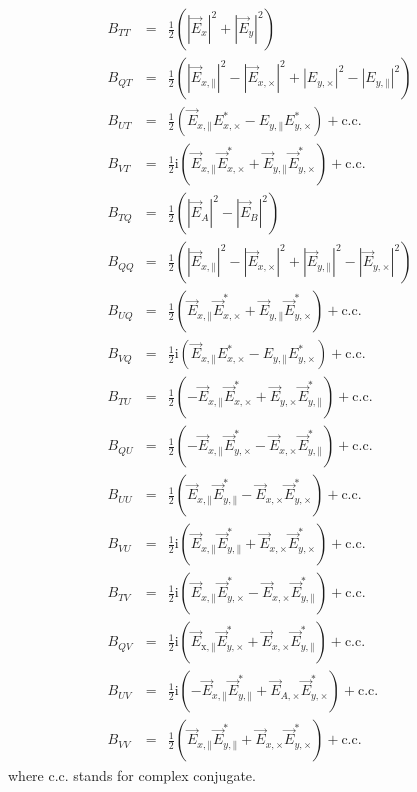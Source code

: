 \documentclass[a4paper,fleqn]{cas-dc}\sloppy
\newcommand{\co}{\mathbin{\|}}
\newcommand{\cx}{\mathbin{\times}}
\begin{document}
\begin{eqnarray}
B_{TT}&=&\frac{1}{2}\left(\left|\vec{E}_{x}\right|^{2}+\left|\vec{E}_{y}\right|^{2}\right)\\
B_{QT}&=&\frac{1}{2}\left(\left|\vec{E}_{x,\co}\right|^{2}-\left|\vec{E}_{x,\cx}\right|^{2} +  \left|E_{y,\cx}\right|^{2}-\left|E_{y,\co}\right|^{2}\right)\\
B_{UT}&=&\frac{1}{2}\left(\vec{E}_{x,\co} E_{x,\cx}^{*} - E_{y,\co} E_{y,\cx}^{*}\right) + \mathrm{c.c.}\\
B_{VT}&=&\frac{1}{2}\mathrm{i}\left(\vec{E}_{x,\co}\vec{E}_{x,\cx}^{*} + \vec{E}_{y,\co} \vec{E}_{y,\cx}^{*}\right) + \mathrm{c.c.}\\
B_{TQ}&=&\frac{1}{2}\left(\left|\vec{E}_{A}\right|^{2}-\left|\vec{E}_{B}\right|^{2}\right)\\
B_{QQ}&=&\frac{1}{2}\left(\left|\vec{E}_{x,\co}\right|^{2}-\left|\vec{E}_{x,\cx}\right|^{2}+\left|\vec{E}_{y,\co}\right|^{2}-\left|\vec{E}_{y,\cx}\right|^{2}\right)\\
B_{UQ}&=&\frac{1}{2}\left(\vec{E}_{x,\co} \vec{E}_{x,\cx}^{*} + \vec{E}_{y,\co} \vec{E}_{y,\cx}^{*}\right)+\mathrm{c.c.}\\
B_{VQ}&=&\frac{1}{2}\mathrm{i}\left( \vec{E}_{x,\co} E_{x,\cx}^{*} - E_{y,\co} E_{y,\cx}^{*}\right)+\mathrm{c.c.}\\
B_{TU}&=&\frac{1}{2}\left( -\vec{E}_{x,\co} \vec{E}_{x,\cx}^{*} + \vec{E}_{y,\cx} \vec{E}_{y,\co}^{*}\right)+\mathrm{c.c.}\\
B_{QU}&=&\frac{1}{2}\left(-\vec{E}_{x,\co}\vec{E}_{y,\cx}^{*} - \vec{E}_{x,\cx} \vec{E}_{y,\co}^{*}\right)+\mathrm{c.c.}\\
B_{UU}&=&\frac{1}{2}\left(\vec{E}_{x,\co} \vec{E}_{y,\co}^{*} - \vec{E}_{x,\cx} \vec{E}_{y,\cx}^{*}\right)+\mathrm{c.c.}\\
B_{VU}&=&\frac{1}{2}\mathrm{i}\left(\vec{E}_{x,\co} \vec{E}_{y,\co}^{*} + \vec{E}_{x,\cx}\vec{E}_{y,\cx}^{*}\right)+\mathrm{c.c.}\\
B_{TV}&=&\frac{1}{2}\mathrm{i}\left(\vec{E}_{x,\co} \vec{E}_{y,\cx}^{*} - \vec{E}_{x,\cx}\vec{E}_{y,\co}^{*}\right)+\mathrm{c.c.}\\
B_{QV}&=&\frac{1}{2}\mathrm{i}\left(\vec{E}_{\mathrm{x,\co}} \vec{E}_{y,\cx}^{*} + \vec{E}_{x,\cx} \vec{E}_{y,\co}^{*}\right)+\mathrm{c.c.}\\
B_{UV}&=&\frac{1}{2}\mathrm{i}\left(-\vec{E}_{x,\co} \vec{E}_{y,\co}^{*} + \vec{E}_{A,\cx} \vec{E}_{y,\cx}^{*}\right)+\mathrm{c.c.}\\
B_{VV}&=&\frac{1}{2}\left(\vec{E}_{x,\co} \vec{E}_{y,\co}^{*} + \vec{E}_{x,\cx} \vec{E}_{y,\cx}^{*}\right)+\mathrm{c.c.}
\end{eqnarray}
%
\noindent
where c.c. stands for complex conjugate.
\end{document}
